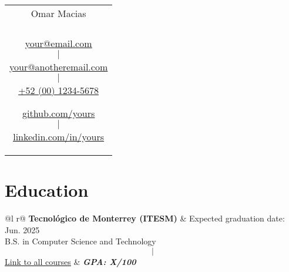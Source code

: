 \documentclass[a4paper,8pt]{article}
\begin{document}
\pagestyle{empty} 


\begin{tabularx}{\linewidth}{@{} C @{}}
\color[HTML]{1C033C} \Huge{Omar Macias} \\[6pt]
\\
\textcolor[HTML]{371e77}{\underline{\href{mailto:your@email.com}{\raisebox{-0.05\height}{\faEnvelope} your@email.com}} $$|$$}
\textcolor[HTML]{371e77}{\underline{\href{mailto:your@anotheremail.com}{\raisebox{-0.05\height}{\faEnvelope} your@anotheremail.com}} $$|$$}
\textcolor[HTML]{371e77}{\href{tel:+525513219900}{\raisebox{-0.05\height}{\faMobile} +52 (00) 1234-5678}}

\textcolor[HTML]{371e77}{\underline{\href{https://github.com/yours}{\raisebox{-0.05\height}{\faGithub} github.com/yours}} $$|$$}
\textcolor[HTML]{371e77}{\underline{\href{https://linkedin.com/in/yours}{\raisebox{-0.05\height}{\faLinkedin} linkedin.com/in/yours}}}
\end{tabularx}

\section{Education}
\begin{tabularx}{\linewidth}{ @{}l r@{} }
\color[HTML]{1C033C} \textbf{Tecnológico de Monterrey (ITESM)} & \hfill \color[HTML]{371e77} Expected graduation date: Jun. 2025 \\
\color[HTML]{371e77} B.S. in Computer Science and Technology $$|$$ {\uline{\href{https://linktoyourcarrer.site}{Link to all courses}}} & \hfill \color[HTML]{4B28A4} \textit{\textbf{GPA: X/100}} \\
\end{tabularx}


\end{document}
